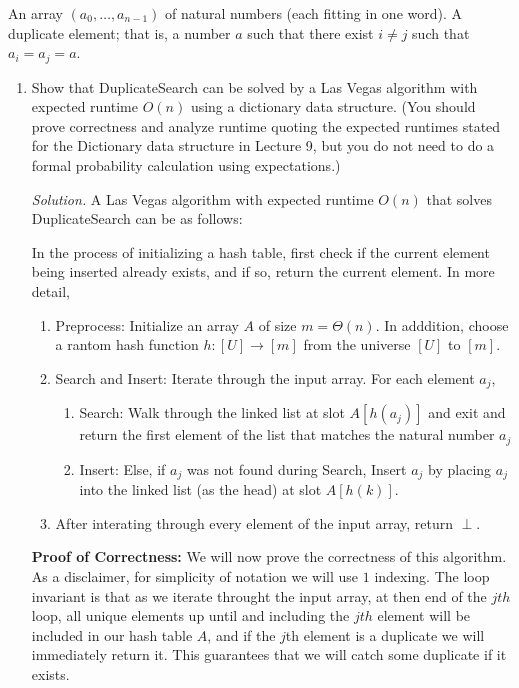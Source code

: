 \documentclass[11pt]{article}
\begin{document}
\begin{enumerate}
{An array $(a_0,\ldots,a_{n-1})$ of natural numbers (each fitting in one word).}
{A duplicate element; that is, a number $a$ such that there exist $i \neq j$ such that $a_i = a_j = a$.}
\begin{enumerate}
    \item Show that DuplicateSearch can be solved by a Las Vegas algorithm with expected runtime $O(n)$ using a dictionary data structure.  (You should prove correctness and analyze runtime quoting the expected runtimes stated for the Dictionary data structure in Lecture 9, but you do not need to do a formal probability calculation using expectations.)  

    \textit{Solution. }A Las Vegas algorithm with expected runtime $O(n)$ that solves DuplicateSearch can be as follows:

    In the process of initializing a hash table, first check if the current element being inserted already exists, and if so, return the current element. In more detail, 
    \begin{enumerate}
        \item Preprocess: Initialize an array $A$ of size $m = \Theta (n)$. In adddition, choose a rantom hash function $h: [U] \rightarrow [m]$ from the universe $[U]$ to $[m]$.
        \item Search and Insert: Iterate through the input array. For each element $a_j$,
        \begin{enumerate}
            \item Search: Walk through the linked list at slot $A[h(a_j)]$ and exit and return the first element of the list that matches the natural number $a_j$
            \item Insert: Else, if $a_j$ was not found during Search, Insert $a_j$ by placing $a_j$ into the linked list (as the head) at slot $A[h(k)]$.
        \end{enumerate}
        \item After interating through every element of the input array, return $\perp$.
    \end{enumerate}

    \textbf{Proof of Correctness: } We will now prove the correctness of this algorithm. As a disclaimer, for simplicity of notation we will use $1$ indexing. The loop invariant is that as we iterate throught the input array, at then end of the $jth$ loop, all unique elements up until and including the $jth$ element will be included in our hash table $A$, and if the $j$th element is a duplicate we will immediately return it. This guarantees that we will catch some duplicate if it exists. 


\end{enumerate}
\end{enumerate}
\end{document}

